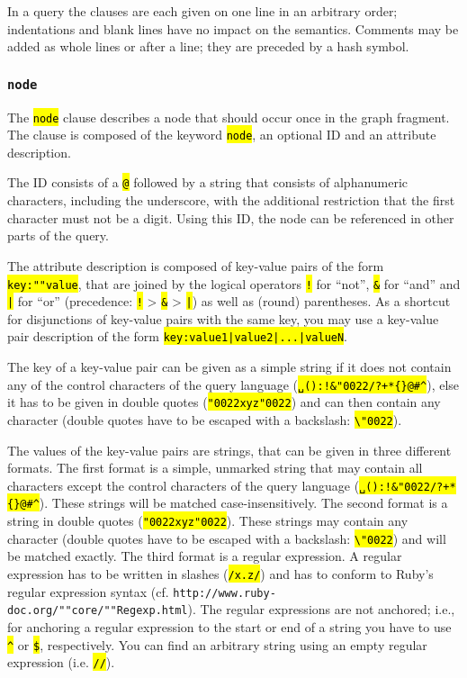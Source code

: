 \documentclass[12pt]{scrartcl}
\newcommand{\quo}{\char"0022}
\newcommand{\code}[1]{\hl{\texttt{#1}}}
\begin{document}
In a query the clauses are each given on one line in an arbitrary order; indentations and blank lines have no impact on the semantics.
Comments may be added as whole lines or after a line; they are preceded by a hash symbol.


\subsubsection{\texttt{node}}\label{node}

The \code{node} clause describes a node that should occur once in the graph fragment.
The clause is composed of the keyword \code{node}, an optional ID and an attribute description.

The ID consists of a \code{@} followed by a string that consists of alphanumeric characters, including the underscore, with the additional restriction that the first character must not be a digit.
Using this ID, the node can be referenced in other parts of the query.

The attribute description is composed of key-value pairs of the form \code{key:""value}, that are joined by the logical operators \code{!} for “not”, \code{\&} for “and” and \code{|} for “or” (precedence: \code{!} > \code{\&} > \code{|}) as well as (round) parentheses.
As a shortcut for disjunctions of key-value pairs with the same key, you may use a key-value pair description of the form \code{key:value1|value2|...|valueN}.

The key of a key-value pair can be given as a simple string if it does not contain any of the control characters of the query language (\code{␣():!\&\quo/?+*\{\}@\#\textasciicircum}), else it has to be given in double quotes (\code{{\quo}xyz\quo}) and can then contain any character (double quotes have to be escaped with a backslash: \code{\textbackslash\quo}).

\label{zeichenketten}The values of the key-value pairs are strings, that can be given in three different formats.
The first format is a simple, unmarked string that may contain all characters except the control characters of the query language (\code{␣():!\&\quo/?+*\{\}@\#\textasciicircum}).
These strings will be matched case-insensitively.
The second format is a string in double quotes (\code{{\quo}xyz\quo}).
These strings may contain any character (double quotes have to be escaped with a backslash: \code{\textbackslash\quo}) and will be matched exactly.
The third format is a regular expression.
A regular expression has to be written in slashes (\code{/x.z/}) and has to conform to Ruby’s regular expression syntax (cf. \texttt{http://www.ruby-doc.org/""core/""Regexp.html}).
The regular expressions are not anchored; i.e., for anchoring a regular expression to the start or end of a string you have to use \code{\textasciicircum} or \code{\$}, respectively.
You can find an arbitrary string using an empty regular expression (i.e. \code{//}).
\end{document}
